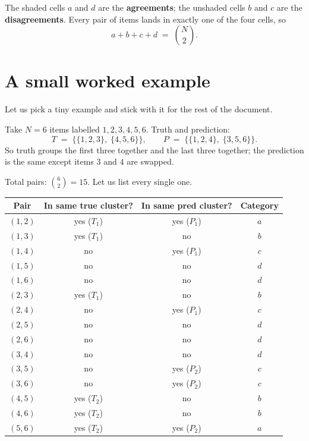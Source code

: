 \documentclass[11pt]{article}
\begin{document}
The shaded cells $a$ and $d$ are the \textbf{agreements}; the unshaded
cells $b$ and $c$ are the \textbf{disagreements}. Every pair of items
lands in exactly one of the four cells, so
\[
  a + b + c + d \;=\; \binom{N}{2}.
\]

\section{A small worked example}
\label{sec:example}

Let us pick a tiny example and stick with it for the rest of the document.

Take $N = 6$ items labelled $1, 2, 3, 4, 5, 6$. Truth and prediction:
\[
  T \;=\; \bigl\{\{1, 2, 3\},\; \{4, 5, 6\}\bigr\}, \qquad
  P \;=\; \bigl\{\{1, 2, 4\},\; \{3, 5, 6\}\bigr\}.
\]
So truth groups the first three together and the last three together;
the prediction is the same except items $3$ and $4$ are swapped.

Total pairs: $\binom{6}{2} = 15$. Let us list every single one.

\begin{table}[H]
\centering
\small
\begin{tabular}{cccc}
\toprule
Pair & In same true cluster? & In same pred cluster? & Category \\
\midrule
$(1, 2)$ & yes ($T_1$) & yes ($P_1$) & $a$ \\
$(1, 3)$ & yes ($T_1$) & no & $b$ \\
$(1, 4)$ & no & yes ($P_1$) & $c$ \\
$(1, 5)$ & no & no & $d$ \\
$(1, 6)$ & no & no & $d$ \\
$(2, 3)$ & yes ($T_1$) & no & $b$ \\
$(2, 4)$ & no & yes ($P_1$) & $c$ \\
$(2, 5)$ & no & no & $d$ \\
$(2, 6)$ & no & no & $d$ \\
$(3, 4)$ & no & no & $d$ \\
$(3, 5)$ & no & yes ($P_2$) & $c$ \\
$(3, 6)$ & no & yes ($P_2$) & $c$ \\
$(4, 5)$ & yes ($T_2$) & no & $b$ \\
$(4, 6)$ & yes ($T_2$) & no & $b$ \\
$(5, 6)$ & yes ($T_2$) & yes ($P_2$) & $a$ \\
\bottomrule
\end{tabular}
\end{table}
\end{document}

